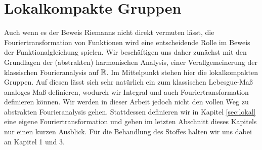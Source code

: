 \section{Lokalkompakte Gruppen}\label{sec:topogroup}
	Auch wenn es der Beweis Riemanns nicht direkt vermuten lässt, die Fouriertransformation von Funktionen wird eine entscheidende Rolle im Beweis der Funktionalgleichung spielen.
	Wir beschäftigen uns daher zunächst mit den Grundlagen der (abstrakten) harmonischen Analysis, einer Verallgemeinerung der klassischen Fourieranalysis auf $\mathbb{R}$.
	Im Mittelpunkt stehen hier die lokalkompakten Gruppen.
	Auf diesen lässt sich sehr natürlich ein zum klassischen Lebesgue-Maß analoges Maß definieren, wodurch wir Integral und auch Fouriertransformation definieren können.
	Wir werden in dieser Arbeit jedoch nicht den vollen Weg zu abstrakten Fourieranalysis gehen.
	Stattdessen definieren wir in Kapitel \ref{sec:lokal} eine eigene Fouriertransformation und geben im letzten Abschnitt dieses Kapitels nur einen kurzen Ausblick.
	Für die Behandlung des Stoffes halten wir uns dabei an \textcite{rama} Kapitel 1 und 3.

